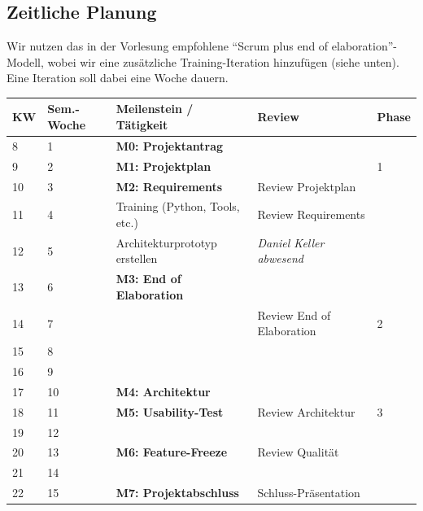 \documentclass[a4paper]{article}
\begin{document}
\subsection{Zeitliche Planung}

Wir nutzen das in der Vorlesung empfohlene ``Scrum plus end of
elaboration''-Modell, wobei wir eine zusätzliche Training-Iteration hinzufügen
(siehe unten). Eine Iteration soll dabei eine Woche dauern.

\begin{tabular}{lllll}
\toprule
KW & Sem.-Woche & Meilenstein / Tätigkeit & Review & Phase \\
\midrule
\midrule
8  & 1 & \textbf{M0: Projektantrag} & & \\
\midrule
9  & 2 & \textbf{M1: Projektplan} & & 1 \\
10 & 3 & \textbf{M2: Requirements} & Review Projektplan & \\
11 & 4 & Training (Python, Tools, etc.) & Review Requirements & \\
12 & 5 & Architekturprototyp erstellen & \emph{Daniel Keller abwesend}& \\
13 & 6 & \textbf{M3: End of Elaboration} & & \\
\midrule
14 & 7 & & Review End of Elaboration & 2 \\
15 & 8 & & & \\
16 & 9 & & & \\
17 & 10 & \textbf{M4: Architektur} & & \\
\midrule
18 & 11 & \textbf{M5: Usability-Test} & Review Architektur & 3 \\
19 & 12 & & & \\
20 & 13 & \textbf{M6: Feature-Freeze} & Review Qualität & \\
21 & 14 & & & \\
22 & 15 & \textbf{M7: Projektabschluss} & Schluss-Präsentation & \\
\bottomrule
\end{tabular}

\end{document}

